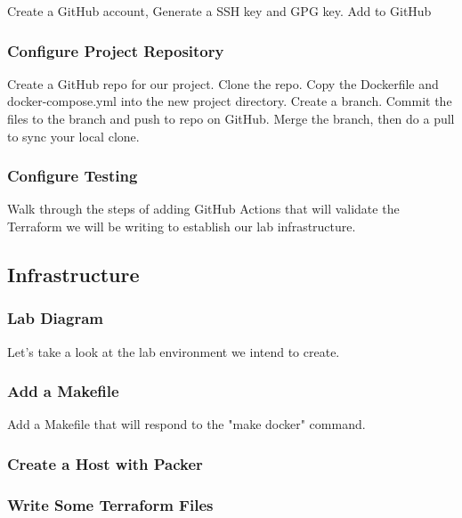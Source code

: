 Create a GitHub account, Generate a SSH key and GPG key. Add to GitHub

\hypertarget{configure-project-repository}{%
\subsubsection{Configure Project
Repository}\label{configure-project-repository}}

Create a GitHub repo for our project. Clone the repo. Copy the
Dockerfile and docker-compose.yml into the new project directory. Create
a branch. Commit the files to the branch and push to repo on GitHub.
Merge the branch, then do a pull to sync your local clone.

\hypertarget{configure-testing}{%
\subsubsection{Configure Testing}\label{configure-testing}}

Walk through the steps of adding GitHub Actions that will validate the
Terraform we will be writing to establish our lab infrastructure.

\hypertarget{infrastructure}{%
\subsection{Infrastructure}\label{infrastructure}}

\hypertarget{lab-diagram}{%
\subsubsection{Lab Diagram}\label{lab-diagram}}

Let's take a look at the lab environment we intend to create.

\hypertarget{add-a-makefile}{%
\subsubsection{Add a Makefile}\label{add-a-makefile}}

Add a Makefile that will respond to the "make docker" command.

\hypertarget{create-a-host-with-packer}{%
\subsubsection{Create a Host with
Packer}\label{create-a-host-with-packer}}

\hypertarget{write-some-terraform-files}{%
\subsubsection{Write Some Terraform
Files}\label{write-some-terraform-files}}

